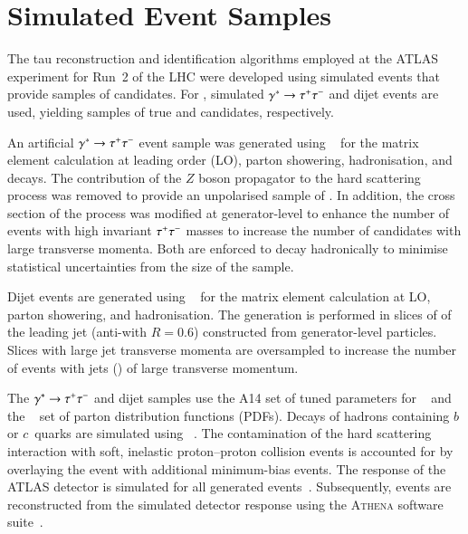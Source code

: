 \section{Simulated Event Samples}%
\label{sec:tauid_mc}

The tau reconstruction and identification algorithms employed at the ATLAS
experiment for Run~2 of the LHC were developed using simulated events that
provide samples of \tauhadvis candidates. For \tauid, simulated
$\gamma^{*} \to \tau^{+} \tau^{-}$ and dijet events are used, yielding samples of true and
\faketauhadvis candidates, respectively.

An artificial $\gamma^{*} \to \tau^{+} \tau^{-}$ event sample was generated
using \PYTHIA[8.212]~\cite{Sjostrand:2014zea} for the matrix element
calculation at leading order (LO), parton showering, hadronisation,
and \tauleptonC decays. The contribution of the $Z$ boson propagator to
the hard scattering process was removed to provide an unpolarised
sample of \tauleptons. In addition, the cross section of the process
was modified at generator-level to enhance the number of events with
high invariant $\tau^{+} \tau^{-}$ masses to increase the number of \tauhadvis
candidates with large transverse momenta. Both \tauleptons
are enforced to decay hadronically to minimise statistical
uncertainties from the size of the \truetauhadvisC sample.

Dijet events are generated using \PYTHIA[8.186]~\cite{Sjostrand:2014zea} for the
matrix element calculation at LO, parton showering, and hadronisation. The
generation is performed in slices of \pT of the leading jet (anti-\kt with
$R = 0.6$) constructed from generator-level particles. Slices with large jet
transverse momenta are oversampled to increase the number of events with jets
(\faketauhadvis) of large transverse momentum.

The $\gamma^{*} \to \tau^{+} \tau^{-}$ and dijet samples use the A14 set of tuned
parameters for \PYTHIA[8]~\cite{ATL-PHYS-PUB-2014-021} and the
\NNPDF[2.3lo]~\cite{Ball:2012cx} set of parton distribution functions (PDFs).
Decays of hadrons containing $b$ or $c$~quarks are simulated using
\EVTGEN[v1.2.0]~\cite{Lange:2001uf}. The contamination of the hard scattering
interaction with soft, inelastic proton--proton collision events is accounted
for by overlaying the event with additional minimum-bias events. The response of
the ATLAS detector is simulated for all generated
events~\cite{SOFT-2010-01}. Subsequently, events are reconstructed from the
simulated detector response using the \textsc{Athena} software
suite~\cite{ATL-SOFT-PUB-2021-001}.


